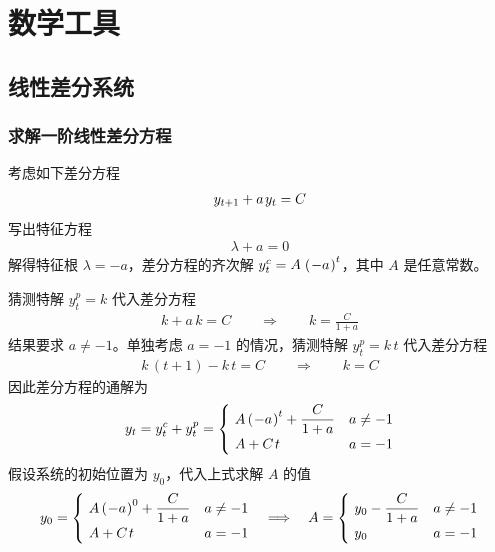 
\chapter{数学工具}

\section{线性差分系统}

\subsection{求解一阶线性差分方程}

考虑如下差分方程
\begin{align*}
    y\nt+a\,y_t=C
\end{align*}
写出特征方程
\begin{align*}
    \lambda+a=0
\end{align*}
解得特征根 \(\lambda=-a\)，差分方程的齐次解 \(y^c_t=A\,\bka{-a}^t\)，其中 \(A\) 是任意常数。

猜测特解 \(y^p_t=k\) 代入差分方程
\begin{align*}
    k+a\,k=C \qquad\Rightarrow\qquad k=\frac{C}{1+a}
\end{align*}
结果要求 \(a\ne-1\)。单独考虑 \(a=-1\) 的情况，猜测特解 \(y^p_t=k\,t\) 代入差分方程
\begin{align*}
    k\,(t+1)-k\,t=C \qquad\Rightarrow\qquad k=C
\end{align*}
因此差分方程的通解为
\begin{equation*}
    y_t=y_t^c+y_t^p=\begin{cases}
        \ A\bka{-a}^{t}+\dfrac C{1+a} & a\neq -1\\
        \ A+C\,t & a=-1
    \end{cases}
\end{equation*}
假设系统的初始位置为 \(y_0\)，代入上式求解 \(A\) 的值
\begin{equation*}
    y_0=\begin{cases}
        \ A\bka{-a}^0 + \dfrac C{1+a} & a\neq -1\\
        \ A+C\,t & a=-1
    \end{cases} \quad \Longrightarrow \quad A=\begin{cases}
        \ y_0-\dfrac C{1+a} & a\neq -1\\
        \ y_0 & a=-1
    \end{cases}
\end{equation*}

